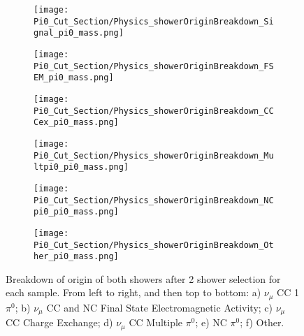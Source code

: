 \begin{figure}[H]
\centering
  \begin{subfigure}[t]{0.25\textwidth}
    \centering
\texttt{[image: Pi0\_Cut\_Section/Physics\_showerOriginBreakdown\_Signal\_pi0\_mass.png]}
  \caption{ }
  \end{subfigure} 
  \hspace{5mm}
  \begin{subfigure}[t]{0.25\textwidth}
    \centering
\texttt{[image: Pi0\_Cut\_Section/Physics\_showerOriginBreakdown\_FSEM\_pi0\_mass.png]}
  \caption{ }
  \end{subfigure} 
  \hspace{5mm}
  \begin{subfigure}[t]{0.25\textwidth}
    \centering
\texttt{[image: Pi0\_Cut\_Section/Physics\_showerOriginBreakdown\_CCCex\_pi0\_mass.png]}
  \caption{ }
  \end{subfigure} 
  \hspace{5mm}
  \begin{subfigure}[t]{0.25\textwidth}
    \centering
\texttt{[image: Pi0\_Cut\_Section/Physics\_showerOriginBreakdown\_Multpi0\_pi0\_mass.png]}
  \caption{ }
  \end{subfigure} 
  \hspace{5mm}
  \begin{subfigure}[t]{0.25\textwidth}
    \centering
\texttt{[image: Pi0\_Cut\_Section/Physics\_showerOriginBreakdown\_NCpi0\_pi0\_mass.png]}
  \caption{ }
  \end{subfigure} 
  \hspace{5mm}
  \begin{subfigure}[t]{0.25\textwidth}
    \centering
\texttt{[image: Pi0\_Cut\_Section/Physics\_showerOriginBreakdown\_Other\_pi0\_mass.png]}
  \caption{ }
  \end{subfigure} 
\caption{ Breakdown of origin of both showers after 2 shower selection for each sample.  From left to right, and then top to bottom: a) $\nu_{\mu}$ CC 1 $\pi^0$; b) $\nu_\mu$ CC and NC Final State Electromagnetic Activity; c) $\nu_{\mu}$ CC Charge Exchange; d) $\nu_\mu$ CC Multiple $\pi^0$; e) NC $\pi^0$; f) Other.  }

\label{fig:physics_showerOriginBreakdown_mass}
\end{figure}


\clearpage

